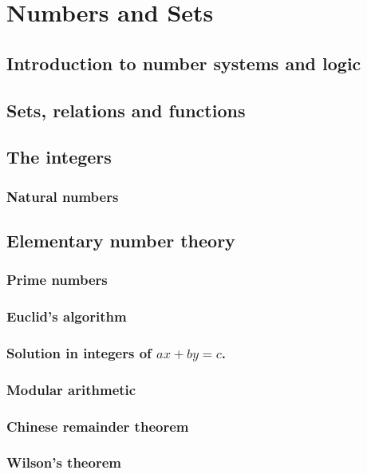 \documentclass[main.tex]{subfiles}
\begin{document}
	\chapter{Numbers and Sets}
	
	\section{Introduction to number systems and logic}
	
	\section{Sets, relations and functions}
	
	\section{The integers}
		\subsection{Natural numbers}
	\section{Elementary number theory}
		\subsection{Prime numbers}
		
		\subsection{Euclid's algorithm}
		
		\subsection{Solution in integers of $ax + by = c$.}
		
		\subsection{Modular arithmetic}
		
		\subsection{Chinese remainder theorem}
		
		\subsection{Wilson's theorem}
\end{document}
